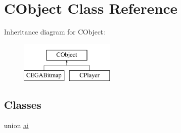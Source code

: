 \hypertarget{class_c_object}{
\section{CObject Class Reference}
\label{class_c_object}
}
Inheritance diagram for CObject:\begin{figure}[H]
\begin{center}
\leavevmode
\includegraphics[height=2cm]{class_c_object}
\end{center}
\end{figure}
\subsection*{Classes}
\begin{DoxyCompactItemize}
\item 
union \hyperlink{union_c_object_1_1ai}{ai}
\end{DoxyCompactItemize}
